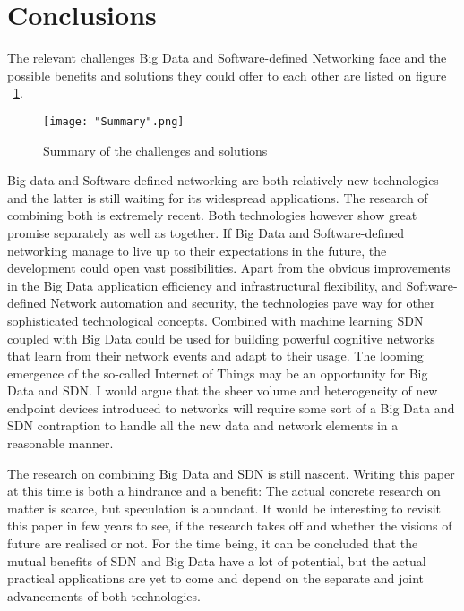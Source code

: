 \documentclass{acm_proc_article-sp}
\begin{document}
\section{Conclusions}

The relevant challenges Big Data and Software-defined Networking face and the possible benefits and solutions they could offer to each other are listed on figure ~\ref{fig:summary}.

\begin{figure}[ht]
\centering
{}
\texttt{[image: "Summary".png]}
\caption{Summary of the challenges and solutions}
\label{fig:summary}
\end{figure} 


Big data and Software-defined networking are both relatively new technologies and the latter is still waiting for its widespread applications. The research of combining both is extremely recent. Both technologies however show great promise separately as well as together. If Big Data and Software-defined networking manage to live up to their expectations in the future, the development could open vast possibilities. Apart from the obvious improvements in the Big Data application efficiency and infrastructural flexibility, and Software-defined Network automation and security, the technologies pave way for other sophisticated technological concepts. Combined with machine learning SDN coupled with Big Data could be used for building powerful cognitive networks that learn from their network events and adapt to their usage. The looming emergence of the so-called Internet of Things may be an opportunity for Big Data and SDN. I would argue that the sheer volume and heterogeneity of new endpoint devices introduced to networks will require some sort of a Big Data and SDN contraption to handle all the new data and network elements in a reasonable manner.

The research on combining Big Data and SDN is still nascent. Writing this paper at this time is both a hindrance and a benefit: The actual concrete research on matter is scarce, but speculation is abundant. It would be interesting to revisit this paper in few years to see, if the research takes off and whether the visions of future are realised or not. For the time being, it can be concluded that the mutual benefits of SDN and Big Data have a lot of potential, but the actual practical applications are yet to come and depend on the separate and joint advancements of both technologies.



\end{document}
